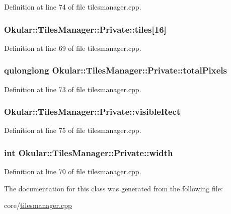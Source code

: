 Definition at line 74 of file tilesmanager.\+cpp.

\hypertarget{classTilesManager_1_1Private_a012e2cd82b699c8338004bb96dfc0402}{
\subsubsection[{tiles}]{ Okular\+::\+Tiles\+Manager\+::\+Private\+::tiles\mbox{[}16\mbox{]}}}\label{classTilesManager_1_1Private_a012e2cd82b699c8338004bb96dfc0402}


Definition at line 69 of file tilesmanager.\+cpp.

\hypertarget{classTilesManager_1_1Private_a74bd95bdb8cf49921bba8f59db98ba9d}{
\subsubsection[{total\+Pixels}]{\setlength{\rightskip}{0pt plus 5cm}qulonglong Okular\+::\+Tiles\+Manager\+::\+Private\+::total\+Pixels}}\label{classTilesManager_1_1Private_a74bd95bdb8cf49921bba8f59db98ba9d}


Definition at line 73 of file tilesmanager.\+cpp.

\hypertarget{classTilesManager_1_1Private_abc6e4b8356815117fa81618fb4a1e714}{
\subsubsection[{visible\+Rect}]{ Okular\+::\+Tiles\+Manager\+::\+Private\+::visible\+Rect}}\label{classTilesManager_1_1Private_abc6e4b8356815117fa81618fb4a1e714}


Definition at line 75 of file tilesmanager.\+cpp.

\hypertarget{classTilesManager_1_1Private_ac3e9434c1fb99eea9c4fc150d9143496}{
\subsubsection[{width}]{\setlength{\rightskip}{0pt plus 5cm}int Okular\+::\+Tiles\+Manager\+::\+Private\+::width}}\label{classTilesManager_1_1Private_ac3e9434c1fb99eea9c4fc150d9143496}


Definition at line 70 of file tilesmanager.\+cpp.



The documentation for this class was generated from the following file\+:\begin{DoxyCompactItemize}
\item 
core/\hyperlink{tilesmanager_8cpp}{tilesmanager.\+cpp}\end{DoxyCompactItemize}
